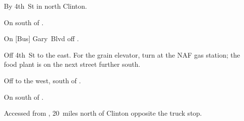 
\begin{LocationList}

By  4th~St in north Clinton.

On  south of .

On [Bus] Gary~Blvd off  .

Off  4th~St to the east.
For the grain elevator, turn at the NAF gas station; the food plant is on the next street further south.

Off  to the west, south of .

\Location{\TruckStop \Gas \Rest \Service}
On  south of .

Accessed from , 20~miles north of Clinton opposite the  truck stop.

\end{LocationList}
